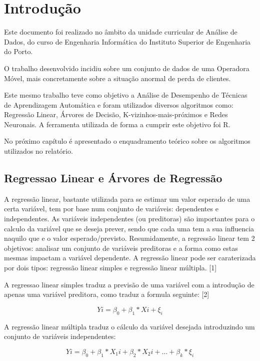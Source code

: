 \section{Introdução}

Este documento foi realizado no âmbito da unidade
curricular de Análise de Dados, do curso de Engenharia
Informática do Instituto Superior de Engenharia do Porto.

O trabalho desenvolvido incidiu sobre um conjunto de dados de uma Operadora Móvel, mais concretamente sobre a situação anormal de perda de clientes.

Este mesmo trabalho teve como objetivo a Análise de Desempenho de Técnicas de Aprendizagem Automática e foram utilizados diversos algoritmos como: Regressão Linear, Árvores de Decisão, K-vizinhos-mais-próximos e Redes Neuronais. A ferramenta utilizada de forma a cumprir este objetivo foi R.

No próximo capítulo é apresentado o enquadramento teórico sobre os algoritmos utilizados no relatório. 

\subsection{Regressao Linear e Árvores de Regressão}

A regressão linear, bastante utilizada para se estimar um valor esperado de uma certa variável, tem por base num conjunto de variáveis: dependentes e independentes. As variáveis independentes (ou preditoras) são importantes para o calculo da variável que se deseja prever, sendo que cada uma tem a sua influencia naquilo que e o valor esperado/previsto. Resumidamente, a regressão linear tem 2 objetivos: analisar um conjunto de variáveis preditoras e a forma como estas mesmas impactam a variável dependente. A regressão linear pode ser caraterizada por dois tipos: regressão linear simples e regressão linear múltipla. 
[1]

A regressao linear simples traduz a previsão de uma variável com a introdução de apenas uma variável preditora, como traduz a formula seguinte: [2]

\begin{center}
{$$Yi = \beta_0 + \beta_1 \ast Xi + \xi_i$$}
\end{center}

A regressão linear múltipla traduz o cálculo da variável desejada introduzindo um conjunto de variáveis independentes:

\begin{center}
{$$Yi = \beta_0 + \beta_1 \ast X_1i + \beta_2 \ast X_2i + ... + \beta_k \ast \xi_i$$}
\end{center}

